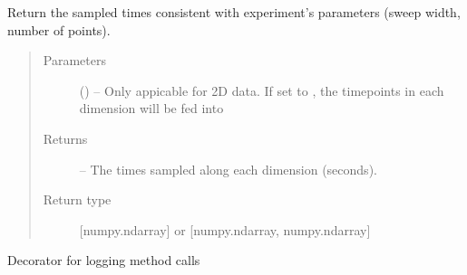 \documentclass[letterpaper,10pt,english]{sphinxmanual}
\begin{document}
\begin{fulllineitems}
\begin{fulllineitems}
\label{\detokenize{references/core:nmrespy.core.Estimator.get_timepoints}}
\sphinxAtStartPar
Return the sampled times consistent with experiment’s
parameters (sweep width, number of points).
\begin{quote}\begin{description}
\item[{Parameters}] \leavevmode
\sphinxAtStartPar
{} () – 
\sphinxAtStartPar
Only appicable for 2D data. If set to , the time\sphinxhyphen{}points in
each dimension will be fed into


\item[{Returns}] \leavevmode
\sphinxAtStartPar
{} – The times sampled along each dimension (seconds).

\item[{Return type}] \leavevmode
\sphinxAtStartPar
{[}numpy.ndarray{]} or {[}numpy.ndarray, numpy.ndarray{]}

\end{description}\end{quote}

\end{fulllineitems}


\begin{fulllineitems}
\label{\detokenize{references/core:nmrespy.core.Estimator.logger}}
\sphinxAtStartPar
Decorator for logging {\hyperref[\detokenize{references/core:nmrespy.core.Estimator}]{}} method calls

\end{fulllineitems}



\end{fulllineitems}
\end{document}
